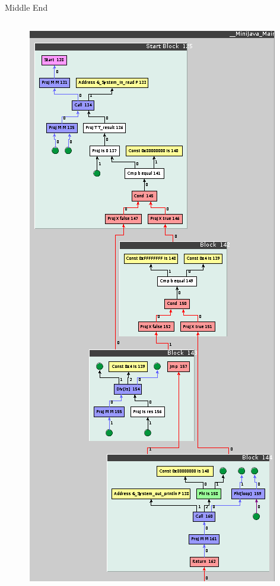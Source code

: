\documentclass[en,16:9]{sdqbeamer}
\begin{document}
\begin{frame}{Middle End}
\begin{columns}
		\begin{column}{0.25\linewidth}
			\vspace{-3em}
			\begin{figure}
				\centering
				\includegraphics[scale=0.3]{images/optimization-before.png}
			\end{figure}
		\end{column}


\end{columns}
\end{frame}
\end{document}
